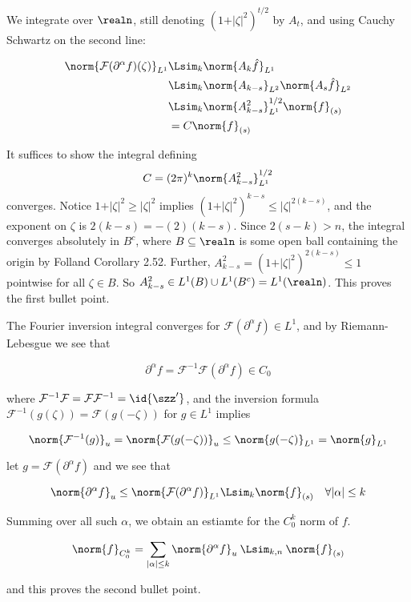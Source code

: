 We integrate over \(\realn\), still denoting
\((1+\vert\zeta\vert^2)^{t/2}\) by \(A_t\), and using Cauchy Schwartz on
the second line:

\[
\begin{align}
\norm{\mathcal{F}(\partial^\alpha f)(\zeta)}_{L^1}&\Lsim_k \norm{A_k \hat{f}}_{L^1}\\
&\Lsim_k \norm{A_{k-s}}_{L^2}\norm{A_{s}\hat{f}}_{L^2}\\
&\Lsim_k \norm{A^2_{k-s}}_{L^1}^{1/2}\norm{f}_{(s)}\\
&= C\norm{f}_{(s)}
\end{align}
\]

It suffices to show the integral defining
\[C= (2\pi)^k\norm{A^2_{k-s}}_{L^1}^{1/2}\] converges. Notice
\(1+\vert\zeta\vert^2\geq \vert\zeta\vert^2\) implies
\((1+\vert\zeta\vert^2)^{k-s}\leq\vert\zeta\vert^{2(k-s)}\), and the
exponent on \(\zeta\) is \(2(k-s) = -(2)(k-s)\). Since \(2(s-k)>n\), the
integral converges absolutely in \(B^c\), where \(B\subseteq\realn\) is
some open ball containing the origin by Folland Corollary 2.52. Further,
\(A_{k-s}^{2} = (1+\vert\zeta\vert^2)^{2(k-s)}\leq 1\) pointwise for all
\(\zeta\in B\). So \(A_{k-s}^2\in L^1(B)\cup L^1(B^c) = L^1(\realn)\).
This proves the first bullet point.

The Fourier inversion integral converges for
\(\mathcal{F}(\partial^\alpha f)\in L^1\), and by Riemann-Lebesgue we
see that

\[
\partial^\alpha f=\mathcal{F}^{-1}\mathcal{F}(\partial^\alpha f)\in C_0
\]

where
\(\mathcal{F}^{-1}\mathcal{F} = \mathcal{F}\mathcal{F}^{-1} = \id{\szz'}\),
and the inversion formula
\(\mathcal{F}^{-1}(g(\zeta)) = \mathcal{F}(g(-\zeta))\) for \(g\in L^1\)
implies

\[
\norm{\mathcal{F}^{-1}(g)}_u = \norm{\mathcal{F}(g(-\zeta))}_u\leq \norm{g(-\zeta)}_{L^1}=\norm{g}_{L^1}
\]

let \(g = \mathcal{F}(\partial^\alpha f)\) and we see that

\[
\norm{\partial^\alpha f}_u\leq \norm{\mathcal{F}(\partial^\alpha f)}_{L^1}\Lsim_k \norm{f}_{(s)}\quad\forall \vert\alpha\vert\leq k
\]

Summing over all such \(\alpha\), we obtain an estiamte for the
\(C_0^k\) norm of \(f\).

\[
\norm{f}_{C_0^k} =\sum_{\vert\alpha\vert\leq k}\norm{\partial^\alpha f}_u \:\Lsim_{k,n}\: \norm{f}_{(s)}
\]

and this proves the second bullet point.

